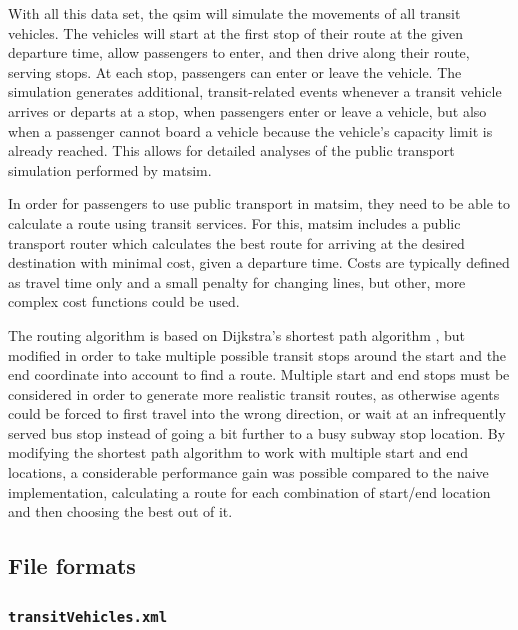 With all this data set, the \gls{qsim} will simulate the movements of all
transit vehicles. The vehicles will start at the first stop of their route at the given
departure time, allow passengers to enter, and then drive along their route,
serving stops. At each stop, passengers can enter or leave the vehicle.
The simulation generates additional, transit-related events whenever a transit
vehicle arrives or departs at a stop, when passengers enter or leave a vehicle,
but also when a passenger cannot board a vehicle because the vehicle's capacity
limit is already reached. This allows for detailed analyses of the public transport
simulation performed by \gls{matsim}.

In order for passengers to use public transport in \gls{matsim}, they need to be able
to calculate a route using transit services. For this, \gls{matsim} includes a public
transport router which calculates the best route for arriving at the desired
destination with minimal cost, given a departure time. Costs are typically
defined as travel time only and a small penalty for changing lines, but other,
more complex cost functions could be used.

The routing algorithm is based on Dijkstra's shortest path algorithm
\citep{Dijkstra1959ShortestPath}, but modified in order to take
multiple possible transit stops around the start and the end coordinate
into account to find a route. Multiple start and end stops must be considered in
order to generate more realistic transit routes, as otherwise agents could
be forced to first travel into the wrong direction, or wait at an infrequently
served bus stop instead of going a bit further to a busy subway stop location.
By modifying the shortest path algorithm to work with multiple start and end
locations, a considerable performance gain was possible compared to the naive
implementation, calculating a route for each combination of start/end location
and then choosing the best out of it.

\subsection{File formats}

\subsubsection{\lstinline|transitVehicles.xml|}
\label{sec:inputdata:transitvehicles}

